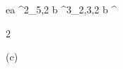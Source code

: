 \begin{eqcode}{e}{a }{^2_{5,2}}{}
  b \in {}^3_{2,3,2} \lend
  b \gets \genar \limits ^ {  \begin{tmatrix}
  2  \lend
  \end{tmatrix} }(c)  \lend %
\end{eqcode}
